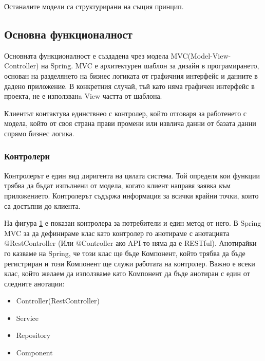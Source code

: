         Останалите модели са структурирани на същия принцип.

    \subsection{Основна функционалност}
    Основната функционалност е създадена чрез модела MVC(Model-View-Controller) на Spring. MVC е архитектурен шаблон за дизайн в програмирането, основан на разделянето на бизнес логиката от графичния интерфейс и данните в дадено приложение. В конкретния случай, тъй като няма графичен интерфейс в проекта, не е използванa View частта от шаблона. 
    
    Клиентът контактува единствнео с контролер, който отговаря за работенето с модела, който от своя страна прави промени или извлича данни от базата данни спрямо бизнес логика.

        \subsubsection{Контролери}
        Контролерът е един вид диригента на цялата система. Той определя кои функции трябва да бъдат изпълнени от модела, когато клиент направя заявка към приложението. Контролерът съдържа информация за всички крайни точки, които са достъпни до клиента. 
        
        \begin{figure}[h]
            \centering
            \caption{}
            \label{fig:user_controller}
        \end{figure}
        
        На фигура \ref{fig:user_controller} е показан контролера за потребители и един метод от него. В Spring MVC за да дефинираме клас като контролер го анотираме с анотацията @RestController (Или @Controller ако API-то няма да е RESTful). Анотирайки го казваме на Spring, че този клас ще бъде Компонент, който трябва да бъде регистриран и този Компонент ще служи работата на контролер. Важно е всеки клас, който желаем да използваме като Компонент да бъде анотиран с един от следните анотации:
        \begin{itemize}
            \item Controller(RestController)
            \item Service
            \item Repository
            \item Component
        \end{itemize}
        
